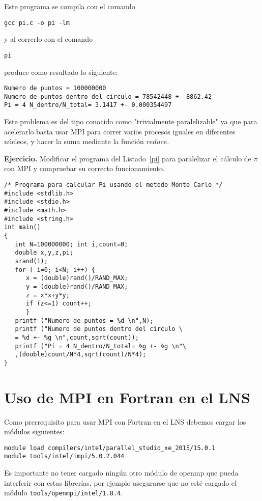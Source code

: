 \documentclass[letter]{jpconf}
\begin{document}
Este programa se compila con el comando
\color{blue}
\begin{verbatim}
gcc pi.c -o pi -lm
\end{verbatim}
\color{black}
y al correrlo con el comando 
\color{blue}
\begin{verbatim}
pi
\end{verbatim}
\color{black}
produce como resultado lo siguiente:
\color{brown}
\begin{verbatim}
Numero de puntos = 100000000 
Numero de puntos dentro del circulo = 78542448 +- 8862.42 
Pi = 4 N_dentro/N_total= 3.1417 +- 0.000354497 
\end{verbatim}
\color{black}

Este problema es del tipo conocido como "trivialmente paralelizable" ya que para acelerarlo basta usar MPI para correr varios procesos iguales en diferentes n\'ucleos, y 
hacer la suma mediante la funci\'on $reduce$. 

\textbf{Ejercicio.}  Modificar el programa del Listado~\ref{pi}  para paralelizar el c\'alculo de $\pi$ con MPI y compruebar su correcto funcionamiento.


\begin{lstlisting}[float,floatplacement=H,label=pi,caption=Listado del programa  secuencial que calcula $\pi$ en C.]
/* Programa para calcular Pi usando el metodo Monte Carlo */
#include <stdlib.h>
#include <stdio.h>
#include <math.h>
#include <string.h>
int main()
{
   int N=100000000; int i,count=0;
   double x,y,z,pi;
   srand(1);
   for ( i=0; i<N; i++) {
      x = (double)rand()/RAND_MAX;
      y = (double)rand()/RAND_MAX;
      z = x*x+y*y;
      if (z<=1) count++;
      }
   printf ("Numero de puntos = %d \n",N);
   printf ("Numero de puntos dentro del circulo \
   = %d +- %g \n",count,sqrt(count));
   printf ("Pi = 4 N_dentro/N_total= %g +- %g \n"\
   ,(double)count/N*4,sqrt(count)/N*4);
}
\end{lstlisting}



\section{\label{seccionFortran} Uso de MPI en Fortran en el LNS}

Como prerrequisito para usar MPI con Fortran en el LNS debemos cargar los m\'odulos siguientes:
\color{blue}
\begin{verbatim}
module load compilers/intel/parallel_studio_xe_2015/15.0.1
module tools/intel/impi/5.0.2.044
\end{verbatim}
\color{black}
Es importante no tener cargado ning\'un otro m\'odulo de openmp que pueda interferir con estas librer\'ias, por ejemplo asegurarse que no est\'e cargado el m\'odulo 
\texttt{tools/openmpi/intel/1.8.4}.
\end{document}
